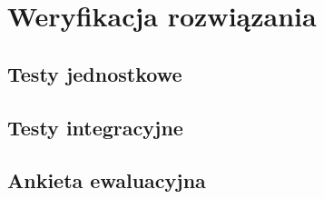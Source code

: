 \chapter{Weryfikacja rozwiązania}

\lipsum[1]

\section{Testy jednostkowe}

\lipsum[3]

\section{Testy integracyjne}

\lipsum[2]

\section{Ankieta ewaluacyjna}

\lipsum[4]
